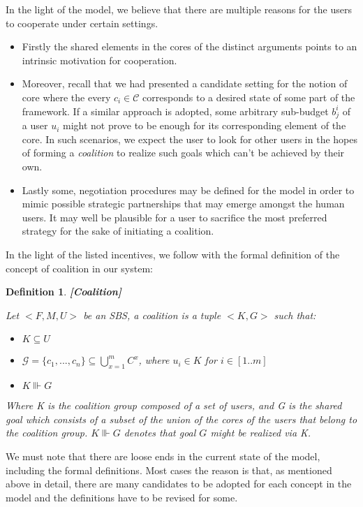 \documentclass{article}
\newtheorem{definition}{Definition}
\begin{document}
In the light of the model, we believe that there are multiple reasons for the users to cooperate under certain settings. 
\begin{itemize}
\item Firstly the shared elements in the cores of the distinct arguments points to an intrinsic motivation for cooperation. 
\item Moreover, recall that we had presented a candidate setting for the notion of core   where the every $c_i \in \mathcal{C}$ corresponds to a desired state of some part of the framework. If a similar approach is adopted,  some arbitrary sub-budget  $b_j^i$ of a user $u_i$ might not prove to be enough for its corresponding element of the core. In such scenarios, we expect the user to look for other users in the hopes of forming a \emph{coalition} to realize such goals which can't be achieved by their own.   
\item Lastly some, negotiation procedures may be defined for the model in order to mimic possible strategic partnerships that may emerge amongst the human users. It may well be plausible for a user to sacrifice the most preferred strategy for the sake of initiating a coalition. 
\end{itemize}

In the light of the listed incentives, we follow with the formal definition of the concept of coalition in our system:

\begin{definition}\textbf{[Coalition]}

Let  $<F, M, U>$ be an SBS, a coalition is a tuple $<K, G>$ such that:

\begin{itemize}
\item $K \subseteq U$
\item $\mathcal{G} = \{c_1,..., c_n\} \subseteq \bigcup_{x=1}^{m} C^{x} $, where  $u_i \in K$ for $i \in [1..m]$  %
\item $ K \Vvdash G$

\end{itemize}

Where K is the coalition group composed of a set of users, and G is the shared goal which consists of a subset of the union of the cores of the users that belong to the coalition group. $ K \Vvdash G$ denotes that goal $G$ might be realized via K.

\end{definition}

We must note that there are loose ends in the current state of the model, including the formal definitions. Most cases the reason is that, as mentioned above in detail, there are many candidates to be adopted for each concept in the model and the definitions have to be revised for some.
\end{document}
